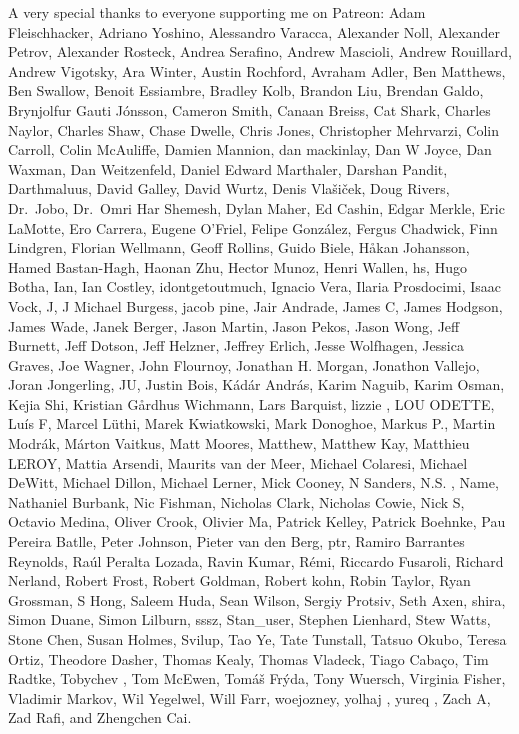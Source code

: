 \documentclass[
  letterpaper,
  DIV=11,
  numbers=noendperiod]{scrartcl}
\begin{document}
A very special thanks to everyone supporting me on Patreon: Adam
Fleischhacker, Adriano Yoshino, Alessandro Varacca, Alexander Noll,
Alexander Petrov, Alexander Rosteck, Andrea Serafino, Andrew Mascioli,
Andrew Rouillard, Andrew Vigotsky, Ara Winter, Austin Rochford, Avraham
Adler, Ben Matthews, Ben Swallow, Benoit Essiambre, Bradley Kolb,
Brandon Liu, Brendan Galdo, Brynjolfur Gauti Jónsson, Cameron Smith,
Canaan Breiss, Cat Shark, Charles Naylor, Charles Shaw, Chase Dwelle,
Chris Jones, Christopher Mehrvarzi, Colin Carroll, Colin McAuliffe,
Damien Mannion, dan mackinlay, Dan W Joyce, Dan Waxman, Dan Weitzenfeld,
Daniel Edward Marthaler, Darshan Pandit, Darthmaluus, David Galley,
David Wurtz, Denis Vlašiček, Doug Rivers, Dr.~Jobo, Dr.~Omri Har
Shemesh, Dylan Maher, Ed Cashin, Edgar Merkle, Eric LaMotte, Ero
Carrera, Eugene O'Friel, Felipe González, Fergus Chadwick, Finn
Lindgren, Florian Wellmann, Geoff Rollins, Guido Biele, Håkan Johansson,
Hamed Bastan-Hagh, Haonan Zhu, Hector Munoz, Henri Wallen, hs, Hugo
Botha, Ian, Ian Costley, idontgetoutmuch, Ignacio Vera, Ilaria
Prosdocimi, Isaac Vock, J, J Michael Burgess, jacob pine, Jair Andrade,
James C, James Hodgson, James Wade, Janek Berger, Jason Martin, Jason
Pekos, Jason Wong, Jeff Burnett, Jeff Dotson, Jeff Helzner, Jeffrey
Erlich, Jesse Wolfhagen, Jessica Graves, Joe Wagner, John Flournoy,
Jonathan H. Morgan, Jonathon Vallejo, Joran Jongerling, JU, Justin Bois,
Kádár András, Karim Naguib, Karim Osman, Kejia Shi, Kristian Gårdhus
Wichmann, Lars Barquist, lizzie , LOU ODETTE, Luís F, Marcel Lüthi,
Marek Kwiatkowski, Mark Donoghoe, Markus P., Martin Modrák, Márton
Vaitkus, Matt Moores, Matthew, Matthew Kay, Matthieu LEROY, Mattia
Arsendi, Maurits van der Meer, Michael Colaresi, Michael DeWitt, Michael
Dillon, Michael Lerner, Mick Cooney, N Sanders, N.S. , Name, Nathaniel
Burbank, Nic Fishman, Nicholas Clark, Nicholas Cowie, Nick S, Octavio
Medina, Oliver Crook, Olivier Ma, Patrick Kelley, Patrick Boehnke, Pau
Pereira Batlle, Peter Johnson, Pieter van den Berg, ptr, Ramiro
Barrantes Reynolds, Raúl Peralta Lozada, Ravin Kumar, Rémi, Riccardo
Fusaroli, Richard Nerland, Robert Frost, Robert Goldman, Robert kohn,
Robin Taylor, Ryan Grossman, S Hong, Saleem Huda, Sean Wilson, Sergiy
Protsiv, Seth Axen, shira, Simon Duane, Simon Lilburn, sssz, Stan\_user,
Stephen Lienhard, Stew Watts, Stone Chen, Susan Holmes, Svilup, Tao Ye,
Tate Tunstall, Tatsuo Okubo, Teresa Ortiz, Theodore Dasher, Thomas
Kealy, Thomas Vladeck, Tiago Cabaço, Tim Radtke, Tobychev , Tom McEwen,
Tomáš Frýda, Tony Wuersch, Virginia Fisher, Vladimir Markov, Wil
Yegelwel, Will Farr, woejozney, yolhaj , yureq , Zach A, Zad Rafi, and
Zhengchen Cai.
\end{document}
